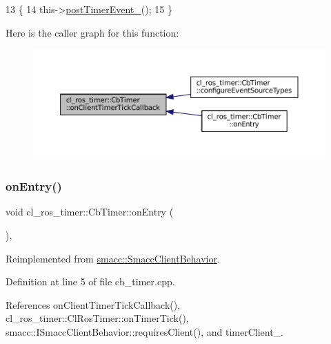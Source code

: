 \begin{DoxyCode}
13 \{
14     this->\hyperlink{classcl__ros__timer_1_1CbTimer_ad2b7913a84459d635fdcca8d346c7af2}{postTimerEvent\_}();
15 \}
\end{DoxyCode}
Here is the caller graph for this function\+:
\nopagebreak
\begin{figure}[H]
\begin{center}
\leavevmode
\includegraphics[width=350pt]{classcl__ros__timer_1_1CbTimer_a9895eb7e05a5922fa27f2bc46f5486a0_icgraph}
\end{center}
\end{figure}
\mbox{\label{classcl__ros__timer_1_1CbTimer_aceba45e86271cf1b7333e2f42c246a38}} 
\subsubsection{\texorpdfstring{on\+Entry()}{onEntry()}}
{\footnotesize\ttfamily void cl\+\_\+ros\+\_\+timer\+::\+Cb\+Timer\+::on\+Entry (\begin{DoxyParamCaption}{ }\end{DoxyParamCaption})\hspace{0.3cm}{\ttfamily [override]}, {\ttfamily [virtual]}}



Reimplemented from \hyperlink{classsmacc_1_1SmaccClientBehavior_ad5d3e1f1697c3cfe66c94cadba948493}{smacc\+::\+Smacc\+Client\+Behavior}.



Definition at line 5 of file cb\+\_\+timer.\+cpp.



References on\+Client\+Timer\+Tick\+Callback(), cl\+\_\+ros\+\_\+timer\+::\+Cl\+Ros\+Timer\+::on\+Timer\+Tick(), smacc\+::\+I\+Smacc\+Client\+Behavior\+::requires\+Client(), and timer\+Client\+\_\+.


